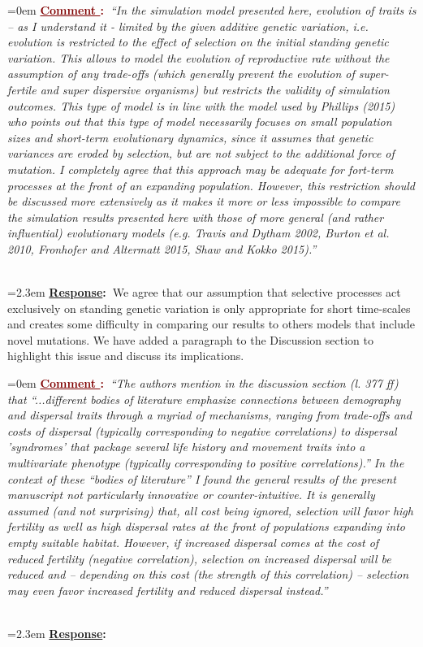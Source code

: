 \documentclass[12pt]{article}
\newcounter{cN}
\newcommand{\comment}[1]{
	\vspace{2em}
	\refstepcounter{cN} %
	\noindent \hangindent=0em \textbf{\textcolor{Maroon}{\uline{Comment \thecN}:~}}\emph{``#1''}
	}
\newcommand{\response}[1]{
	\\[0.25em]
	\hangindent=2.3em \textbf{\textcolor{NavyBlue}{\uline{Response}:~}}#1
	}
\begin{document}
\comment{In the simulation model presented here, evolution of traits is – as I understand it - limited by the given additive genetic variation, i.e. evolution is restricted to the effect of selection on the initial standing genetic variation. 
This allows to model the evolution of reproductive rate without the assumption of any trade-offs (which generally prevent the evolution of super-fertile and super dispersive organisms) but restricts the validity of simulation outcomes. 
This type of model is in line with the model used by Phillips (2015) who points out that this type of model necessarily focuses on small population sizes and short-term evolutionary dynamics, since it assumes that genetic variances are eroded by selection, but are not subject to the additional force of mutation. 
I completely agree that this approach may be adequate for fort-term processes at the front of an expanding population. 
However, this restriction should be discussed more extensively as it makes it more or less impossible to compare the simulation results presented here with those of more general (and rather influential) evolutionary models (e.g. Travis and Dytham 2002, Burton et al. 2010, Fronhofer and Altermatt 2015, Shaw and Kokko 2015).}
\response{We agree that our assumption that selective processes act exclusively on standing genetic variation is only appropriate for short time-scales and creates some difficulty in comparing our results to others models that include novel mutations. We have added a paragraph to the Discussion section to highlight this issue and discuss its implications.}

\comment{The authors mention in the discussion section (l. 377 ff) that ``...different bodies of literature emphasize connections between demography and dispersal traits through a myriad of mechanisms, ranging from trade-offs and costs of dispersal (typically corresponding to negative correlations) to dispersal 'syndromes' that package several life history and movement traits into a multivariate phenotype (typically corresponding to positive correlations).'' 
In the context of these ``bodies of literature'' I found the general results of the present manuscript not particularly innovative or counter-intuitive. 
It is generally assumed (and not surprising) that, all cost being ignored, selection will favor high fertility as well as high dispersal rates at the front of populations expanding into empty suitable habitat. 
However, if increased dispersal comes at the cost of reduced fertility (negative correlation), selection on increased dispersal will be reduced and – depending on this cost (the strength of this correlation) – selection may even favor increased fertility and reduced dispersal instead.}
\response{}
\end{document}
